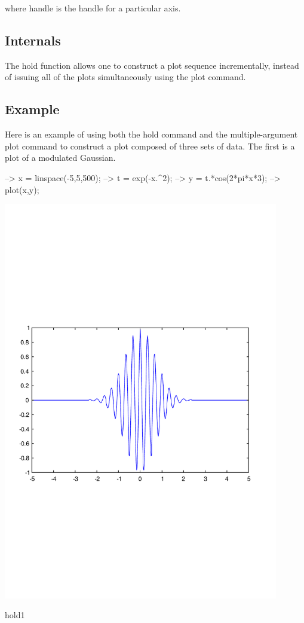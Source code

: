  where {\ttfamily handle} is the handle for a particular axis. \hypertarget{transforms_svd_Function}{}\subsection{Internals}\label{transforms_svd_Function}
The {\ttfamily hold} function allows one to construct a plot sequence incrementally, instead of issuing all of the plots simultaneously using the {\ttfamily plot} command. \hypertarget{variables_struct_Example}{}\subsection{Example}\label{variables_struct_Example}
Here is an example of using both the {\ttfamily hold} command and the multiple-\/argument {\ttfamily plot} command to construct a plot composed of three sets of data. The first is a plot of a modulated Gaussian.


\begin{DoxyVerbInclude}
--> x = linspace(-5,5,500);
--> t = exp(-x.^2);
--> y = t.*cos(2*pi*x*3);
--> plot(x,y);
\end{DoxyVerbInclude}


 
\begin{DoxyImage}
\includegraphics[width=12cm]{hold1}
\caption{hold1}
\end{DoxyImage}


